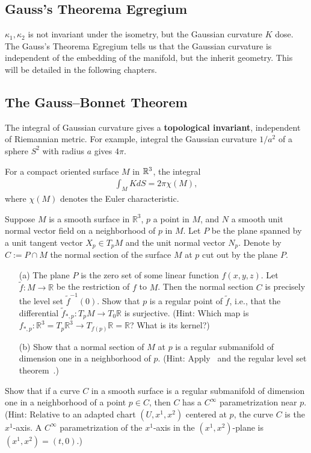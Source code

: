 \subsection{Gauss's Theorema Egregium}
$\kappa_1,\kappa_2$ is not invariant under the isometry, but the Gaussian curvature $K$ dose.
The Gauss's Theorema Egregium tells us that the Gaussian curvature is independent of the
embedding of the manifold, but the inherit geometry. This will be detailed in the following chapters.
\subsection{The Gauss--Bonnet Theorem}
The integral of Gaussian curvature gives a \textbf{topological invariant}, independent of
Riemannian metric. For example,
integral the Gaussian curvature $1/a^2$ of a sphere $S^2$ with radius $a$ gives $4\pi$.

For a compact oriented surface $M$ in ${\mathbb{R}}^3$, the integral
\begin{align}
    \int_{M} K dS = 2\pi \chi(M), \nonumber
\end{align}
where $\chi(M)$ denotes the Euler characteristic.
\begin{problem}
Suppose $M$ is a smooth surface in $\mathbb{R}^3$, 
$p$ a point in $M$, and $N$ a smooth unit normal vector field
 on a neighborhood of $p$ in $M$. Let $P$ be the plane spanned by a unit tangent vector 
 $X_p \in T_p M$ and the unit normal vector $N_p$. 
 Denote by $C := P \cap M$ the normal section of the surface $M$ at $p$ cut out by the plane $P$.

\begin{enumerate}
    \item[(a)] The plane $P$ is the zero set of some linear function $f(x,y,z)$. 
    Let $\tilde{f} \colon M \to \mathbb{R}$ be the restriction of $f$ to $M$. 
    Then the normal section $C$ is precisely the level set $\tilde{f}^{-1}(0)$. 
    Show that $p$ is a regular point of $\tilde{f}$, i.e., 
    that the differential $\tilde{f}_{*,p} \colon T_p M \to T_0 \mathbb{R}$ is surjective. 
    (Hint: Which map is $f_{*,p} \colon \mathbb{R}^3 = T_p \mathbb{R}^3 \to T_{f(p)} 
    \mathbb{R} = \mathbb{R}$? What is its kernel?)

    \item[(b)] Show that a normal section of $M$ at $p$ is a regular submanifold of dimension 
    one in a neighborhood of $p$. (Hint: Apply~\cite[Proposition 11.4]{tu2010introduction} 
    and the regular level set theorem~\cite[Theorem 9.9]{tu2010introduction}.)
\end{enumerate}
\end{problem}

\begin{problem}
    Show that if a curve $C$ in a smooth surface is a regular submanifold of dimension one 
    in a neighborhood of a point $p \in C$, 
    then $C$ has a $C^\infty$ parametrization near $p$. 
    (Hint: Relative to an adapted chart $(U, x^1, x^2)$ centered at $p$, 
    the curve $C$ is the $x^1$-axis. A $C^\infty$ parametrization of the $x^1$-axis 
    in the $(x^1, x^2)$-plane is $(x^1, x^2) = (t, 0)$.)
\end{problem}